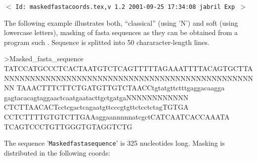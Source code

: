\documentclass[11pt]{article}
\def\nwendcode{\endtrivlist \endgroup} %
\let\nwdocspar=\par                    %
\begin{document}
%

\newpage %
\setcounter{page}{1}
\pagestyle{fancy}
\renewcommand{\sectionmark}[1]{\markboth{}{\thesection.\ #1}}
\renewcommand{\subsectionmark}[1]{\markboth{}{\thesubsection.\ \textsl{#1}}}

\tableofcontents
\listoftables
\listoffigures

\vfill
\begin{center}
{\small$<$ \verb$Id: maskedfastacoords.tex,v 1.2 2001-09-25 17:34:08 jabril Exp $$>$ }
\end{center}


\newpage %
\setcounter{page}{1}



\description



\nwenddocs{}%
%
\nwdocspar

The following example illustrates both, ``classical'' (using 'N') and soft (using lowercase letters), masking of fasta sequences as they can be obtained from a program such {\RptM}. Sequence is splitted into 50 chararacter-length lines.

\begin{center}
\begin{minipage}[c]{0.75\linewidth}
\nwenddocs{}\endmoddef
>Masked_fasta_sequence
TATCCATGCCCTCACTAATGTCTCAGTTTTTAGAAATTTTACAGTGCTTA
NNNNNNNNNNNNNNNNNNNNNNNNNNNNNNNNNNNNNNNNNNNNNNNNNN
TAAACTTTCTTCTGATGTTGTCTAACCtgtatgttctttgaggacaagga
gagtacacagtaggaactcaatgaatacttgctgatgaNNNNNNNNNNNN
CTCTTAACACTcctcgactcagaatgttcccgtgttctcctctagTGTGA
CCTCTTTTGTGTCTTGAAaggaannnnnatcgctCATCAATCACCAAATA
TCAGTCCCTGTTGGGTGTAGGTCTG
\nwendcode{}\nwdocspar
\end{minipage}
\end{center}

The sequence '{\tt{}Masked{}fasta{}sequence}' is 325 nucleotides long. Masking is distributed in the following coords:
\end{document}

